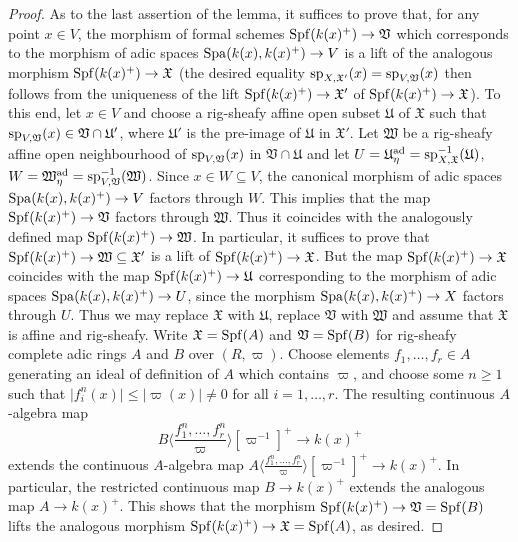 \documentclass[12pt,twoside,a4paper]{article}
\theoremstyle{definition}
\theoremstyle{remark}
\newcommand\ad{{\rm ad}}
\newcommand\spc{{\rm sp}}
\newcommand\Spa{{\rm Spa}}
\newcommand\Spf{{\rm Spf}}
\begin{document}
\begin{proof}
As to the last assertion of the lemma, it suffices to prove that, for any point $x\in V$, the morphism of formal schemes $\Spf(k(x)^{+})\to \mathfrak{V}$ which corresponds to the morphism of adic spaces $\Spa(k(x), k(x)^{+})\to V$ is a lift of the analogous morphism $\Spf(k(x)^{+})\to \mathfrak{X}$ (the desired equality $\spc_{X,\mathfrak{X}'}(x)=\spc_{V,\mathfrak{V}}(x)$ then follows from the uniqueness of the lift $\Spf(k(x)^{+})\to\mathfrak{X}'$ of $\Spf(k(x)^{+})\to \mathfrak{X}$). To this end, let $x\in V$ and choose a rig-sheafy affine open subset $\mathfrak{U}$ of $\mathfrak{X}$ such that $\spc_{V,\mathfrak{V}}(x)\in\mathfrak{V}\cap\mathfrak{U}'$, where $\mathfrak{U}'$ is the pre-image of $\mathfrak{U}$ in $\mathfrak{X}'$. Let $\mathfrak{W}$ be a rig-sheafy affine open neighbourhood of $\spc_{V,\mathfrak{V}}(x)$ in $\mathfrak{V}\cap\mathfrak{U}$ and let $U=\mathfrak{U}_{\eta}^{\ad}=\spc_{X,\mathfrak{X}}^{-1}(\mathfrak{U})$, $W=\mathfrak{W}_{\eta}^{\ad}=\spc_{V,\mathfrak{V}}^{-1}(\mathfrak{W})$. Since $x\in W\subseteq V$, the canonical morphism of adic spaces $\Spa(k(x), k(x)^{+})\to V$ factors through $W$. This implies that the map $\Spf(k(x)^{+})\to \mathfrak{V}$ factors through $\mathfrak{W}$. Thus it coincides with the analogously defined map $\Spf(k(x)^{+})\to \mathfrak{W}$. In particular, it suffices to prove that $\Spf(k(x)^{+})\to \mathfrak{W}\subseteq\mathfrak{X}'$ is a lift of $\Spf(k(x)^{+})\to \mathfrak{X}$. But the map $\Spf(k(x)^{+})\to \mathfrak{X}$ coincides with the map $\Spf(k(x)^{+})\to \mathfrak{U}$ corresponding to the morphism of adic spaces $\Spa(k(x), k(x)^{+})\to U$, since the morphism $\Spa(k(x), k(x)^{+})\to X$ factors through $U$. Thus we may replace $\mathfrak{X}$ with $\mathfrak{U}$, replace $\mathfrak{V}$ with $\mathfrak{W}$ and assume that $\mathfrak{X}$ is affine and rig-sheafy. Write $\mathfrak{X}=\Spf(A)$ and $\mathfrak{V}=\Spf(B)$ for rig-sheafy complete adic rings $A$ and $B$ over $(R, \varpi)$. Choose elements $f_1,\dots, f_r\in A$ generating an ideal of definition of $A$ which contains $\varpi$, and choose some $n\geq1$ such that $\vert f_{i}^{n}(x)\vert\leq \vert\varpi(x)\vert\neq0$ for all $i=1,\dots, r$. The resulting continuous $A$-algebra map \begin{equation*}B\langle\frac{f_1^{n},\dots, f_r^{n}}{\varpi}\rangle[\varpi^{-1}]^{+}\to k(x)^{+}\end{equation*}extends the continuous $A$-algebra map $A\langle\frac{f_1^{n},\dots, f_r^{n}}{\varpi}\rangle[\varpi^{-1}]^{+}\to k(x)^{+}$. In particular, the restricted continuous map $B\to k(x)^{+}$ extends the analogous map $A\to k(x)^{+}$. This shows that the morphism $\Spf(k(x)^{+})\to \mathfrak{V}=\Spf(B)$ lifts the analogous morphism $\Spf(k(x)^{+})\to \mathfrak{X}=\Spf(A)$, as desired.\end{proof}
\end{document}
